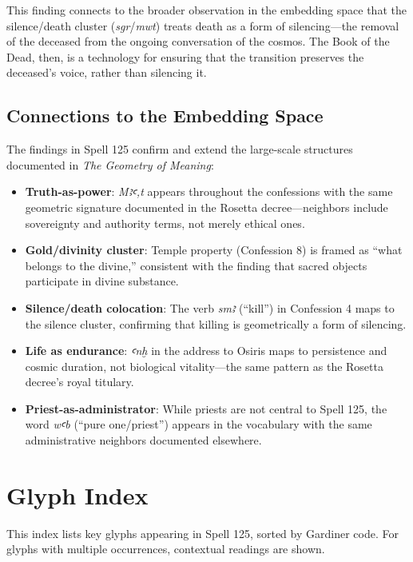 \documentclass[11pt, a4paper]{article}
\begin{document}
This finding connects to the broader observation in the embedding space that the silence/death cluster (\textit{sgr}/\textit{mwt}) treats death as a form of silencing---the removal of the deceased from the ongoing conversation of the cosmos. The Book of the Dead, then, is a technology for ensuring that the transition preserves the deceased's voice, rather than silencing it.

\subsection{Connections to the Embedding Space}

The findings in Spell 125 confirm and extend the large-scale structures documented in \textit{The Geometry of Meaning}:

\begin{itemize}
    \item \textbf{Truth-as-power}: \textit{Mꜣꜥ,t} appears throughout the confessions with the same geometric signature documented in the Rosetta decree---neighbors include sovereignty and authority terms, not merely ethical ones.
    \item \textbf{Gold/divinity cluster}: Temple property (Confession 8) is framed as ``what belongs to the divine,'' consistent with the finding that sacred objects participate in divine substance.
    \item \textbf{Silence/death colocation}: The verb \textit{smꜣ} (``kill'') in Confession 4 maps to the silence cluster, confirming that killing is geometrically a form of silencing.
    \item \textbf{Life as endurance}: \textit{ꜥnḫ} in the address to Osiris maps to persistence and cosmic duration, not biological vitality---the same pattern as the Rosetta decree's royal titulary.
    \item \textbf{Priest-as-administrator}: While priests are not central to Spell 125, the word \textit{wꜥb} (``pure one/priest'') appears in the vocabulary with the same administrative neighbors documented elsewhere.
\end{itemize}

\appendix
\section{Glyph Index}
\label{sec:glyph-index}

This index lists key glyphs appearing in Spell 125, sorted by Gardiner code. For glyphs with multiple occurrences, contextual readings are shown.
\end{document}
